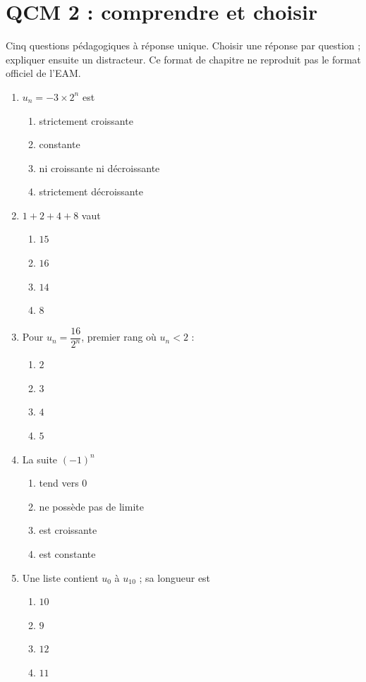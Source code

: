 \endgroup
\begingroup\small
{}\section*{QCM 2 : comprendre et choisir}\label{C01-Q2}
Cinq questions pédagogiques à réponse unique. Choisir une réponse par question ; expliquer ensuite un distracteur. Ce format de chapitre ne reproduit pas le format officiel de l’EAM.
\begin{enumerate}
\item $u_n=-3\times2^n$ est
\begin{enumerate}[label=\Alph*.,itemsep=2pt]
\item strictement croissante
\item constante
\item ni croissante ni décroissante
\item strictement décroissante
\end{enumerate}
\item $1+2+4+8$ vaut
\begin{enumerate}[label=\Alph*.,itemsep=2pt]
\item $15$
\item $16$
\item $14$
\item $8$
\end{enumerate}
\item Pour $u_n=\dfrac{16}{2^n}$, premier rang où $u_n<2$ :
\begin{enumerate}[label=\Alph*.,itemsep=2pt]
\item $2$
\item $3$
\item $4$
\item $5$
\end{enumerate}
\item La suite $(-1)^n$
\begin{enumerate}[label=\Alph*.,itemsep=2pt]
\item tend vers 0
\item ne possède pas de limite
\item est croissante
\item est constante
\end{enumerate}
\item Une liste contient $u_0$ à $u_{10}$ ; sa longueur est
\begin{enumerate}[label=\Alph*.,itemsep=2pt]
\item $10$
\item $9$
\item $12$
\item $11$
\end{enumerate}
\end{enumerate}
